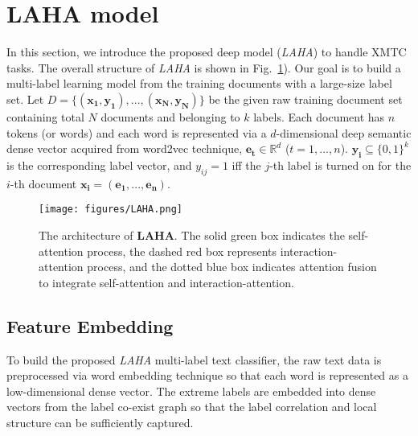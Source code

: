 \documentclass[runningheads]{llncs}
\begin{document}
\vspace{-4mm}
\section{LAHA model}

In this section, we introduce the proposed deep model (\textit{LAHA}) to handle XMTC tasks. The overall structure of \textit{LAHA} is shown in Fig.~\ref{Fig:LAHA}).
Our goal is to build a multi-label learning model from the training documents with a large-size label set. 
Let $D={ \{ \mathbf{({ x }_{ 1 },{ y }_{ 1 }),...,({ x }_{N},{ y }_{N})}\}  }$ be the given raw training document set containing total $N$ documents and belonging to $k$ labels. Each document has $n$ tokens (or words) and each word is represented via a $d$-dimensional deep semantic dense vector acquired from word2vec technique, $\mathbf{{ e }_{ t }}\in { \mathbb{R} }^{ d }$ ($t=1, ..., n$). $\mathbf{y_{i}}\subseteq \{ 0,1\} ^ { k }$ is the corresponding label vector, and $y_{ij }=1$ iff the $j$-th label is turned on for the $i$-th document $\mathbf{{x}_{i}}=(\mathbf{{ e }_1,...,e_n})$. 





\begin{figure}[!h]\centering
	\texttt{[image: figures/LAHA.png]}	
	\setlength{\abovecaptionskip}{0.cm}
	\setlength{\belowcaptionskip}{-0.cm}
	\caption{The architecture of \textbf{LAHA}. The solid green box indicates the self-attention process, the dashed red box represents interaction-attention process, and the dotted blue box indicates attention fusion to integrate self-attention and interaction-attention.} \label{Fig:LAHA}
\end{figure} 




\vspace{-2mm}
\subsection{Feature Embedding}

To build the proposed \textit{LAHA} multi-label text classifier, the raw text data is preprocessed via word embedding technique so that each word is represented as a low-dimensional dense vector. The extreme labels are embedded into dense vectors from the label co-exist graph so that the label correlation and local structure can be sufficiently captured.
\vspace{-2mm}
\end{document}
